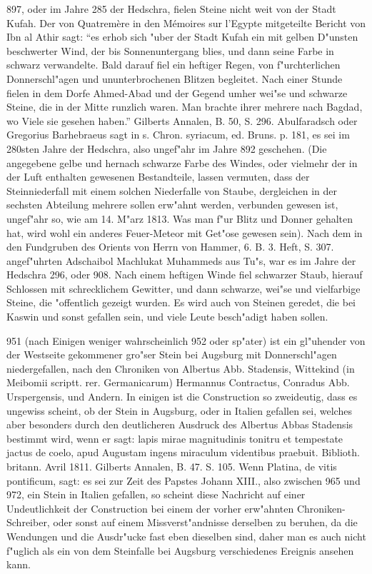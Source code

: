 \documentclass[a4paper, 11pt, oneside, polutonikogreek, german]{article}
\begin{document}
897, oder im Jahre 285 der Hedschra, fielen Steine nicht weit von der Stadt Kufah. Der von Quatremère in den Mémoires sur l'Egypte mitgeteilte Bericht von Ibn al Athir sagt: "`es erhob sich "uber der Stadt Kufah ein mit gelben D"unsten beschwerter Wind, der bis Sonnenuntergang blies, und dann seine Farbe in schwarz verwandelte. Bald darauf fiel ein heftiger Regen, von f"urchterlichen Donnerschl"agen und ununterbrochenen Blitzen begleitet. Nach einer Stunde fielen in dem Dorfe Ahmed-Abad und der Gegend umher wei"se und schwarze Steine, die in der Mitte runzlich waren. Man brachte ihrer mehrere nach Bagdad, wo Viele sie gesehen haben."' Gilberts Annalen, B. 50, S. 296. Abulfaradsch oder Gregorius Barhebraeus sagt in s. Chron. syriacum, ed. Bruns. p. 181, es sei im 280sten Jahre der Hedschra, also ungef"ahr im Jahre 892 geschehen. (Die angegebene gelbe und hernach schwarze Farbe des Windes, oder vielmehr der in der Luft enthalten gewesenen Bestandteile, lassen vermuten, dass der Steinniederfall mit einem solchen Niederfalle von Staube, dergleichen in der sechsten Abteilung mehrere sollen erw"ahnt werden, verbunden gewesen ist, ungef"ahr so, wie am 14. M"arz 1813. Was man f"ur Blitz und Donner gehalten hat, wird wohl ein anderes Feuer-Meteor mit Get"ose gewesen sein). Nach dem in den Fundgruben des Orients von Herrn von Hammer, 6. B. 3. Heft, S. 307. angef"uhrten Adschaibol Machlukat Muhammeds aus Tu"s, war es im Jahre der Hedschra 296, oder 908. Nach einem heftigen Winde fiel schwarzer Staub, hierauf Schlossen mit schrecklichem Gewitter, und dann schwarze, wei"se und vielfarbige Steine, die "offentlich gezeigt wurden. Es wird auch von Steinen geredet, die bei Kaswin und sonst gefallen sein, und viele Leute besch"adigt haben sollen.

951 (nach Einigen weniger wahrscheinlich 952 oder sp"ater) ist ein gl"uhender von der Westseite gekommener gro"ser Stein bei Augsburg mit Donnerschl"agen niedergefallen, nach den Chroniken von Albertus Abb. Stadensis, Wittekind (in Meibomii scriptt. rer. Germanicarum) Hermannus Contractus, Conradus Abb. Urspergensis, und Andern. In einigen ist die Construction so zweideutig, dass es ungewiss scheint, ob der Stein in Augsburg, oder in Italien gefallen sei, welches aber besonders durch den deutlicheren Ausdruck des Albertus Abbas Stadensis bestimmt wird, wenn er sagt: lapis mirae magnitudinis tonitru et tempestate jactus de coelo, apud Augustam ingens miraculum videntibus praebuit. Biblioth. britann. Avril 1811. Gilberts Annalen, B. 47. S. 105. Wenn Platina, de vitis pontificum, sagt: es sei zur Zeit des Papstes Johann XIII., also zwischen 965 und 972, ein Stein in Italien gefallen, so scheint diese Nachricht auf einer Undeutlichkeit der Construction bei einem der vorher erw"ahnten Chroniken-Schreiber, oder sonst auf einem Missverst"andnisse derselben zu beruhen, da die Wendungen und die Ausdr"ucke fast eben dieselben sind, daher man es auch nicht f"uglich als ein von dem Steinfalle bei Augsburg verschiedenes Ereignis ansehen kann.
\end{document}
